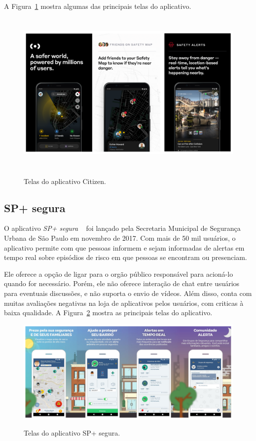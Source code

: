 A Figura~\ref{f.citizen} mostra algumas das principais telas do aplicativo.

\begin{figure}[htbp]
	\caption{\small Telas do aplicativo Citizen.}
	\centering
	\includegraphics[height=8cm]{./images/citizen.png}
	\label{f.citizen}
\end{figure}

\FloatBarrier

\subsection{SP+ segura}

O aplicativo \emph{SP+ segura} ~\cite{sp-mais-segura} foi lançado pela Secretaria Municipal de Segurança Urbana de São Paulo em novembro de 2017. Com mais de 50 mil usuários, o aplicativo permite com que pessoas informem e sejam informadas de alertas em tempo real sobre episódios de risco em que pessoas se encontram ou presenciam. 

Ele oferece a opção de ligar para o orgão público responsável para acioná-lo quando for necessário. Porém, ele não oferece interação de chat entre usuários para eventuais discussões, e não suporta o envio de vídeos. Além disso, conta com muitas avaliações negativas na loja de aplicativos pelos usuários, com criticas à baixa qualidade. A Figura~\ref{f.sp-mais-segura} mostra as principais telas do aplicativo.

\begin{figure}[htbp]
	\caption{\small Telas do aplicativo SP+ segura.}
	\centering
	\includegraphics[width=\textwidth]{./images/sp-mais-segura.png}
	\label{f.sp-mais-segura}
\end{figure}

